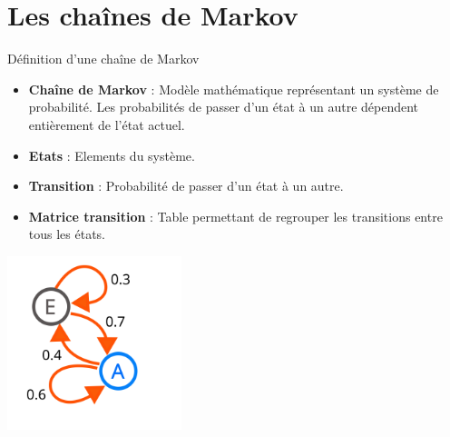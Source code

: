 \section{Les chaînes de Markov}


\begin{frame}{Définition d'une chaîne de Markov}
	\begin{itemize}
	    \item \textbf{Chaîne de Markov} : Modèle mathématique représentant un système de probabilité. Les probabilités de passer d'un état à un autre dépendent entièrement de l'état actuel.
        \item \textbf{Etats} : Elements du système.
        \item \textbf{Transition} : Probabilité de passer d'un état à un autre. 
        \item \textbf{Matrice transition} : Table permettant de regrouper les transitions entre tous les états. 
	\end{itemize}
	\begin{center}
		\includegraphics[width=0.38\textwidth]{images/def_markov.png}
        \vspace*{0.3cm}
	\end{center}
	
\end{frame}

